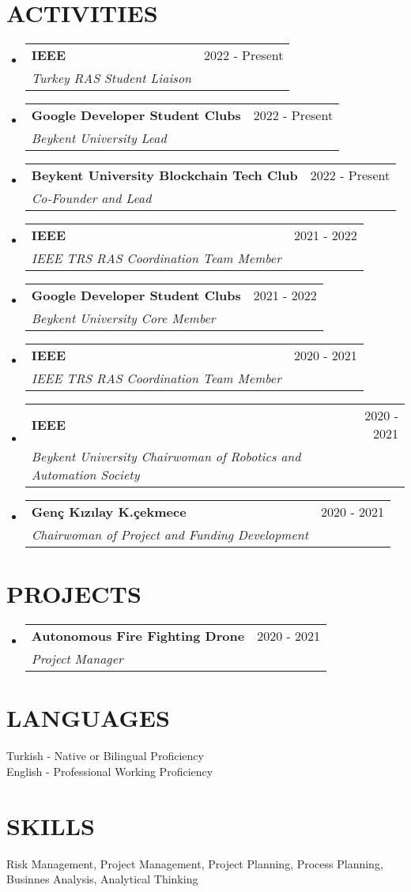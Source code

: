 \documentclass[letterpaper,11pt]{article}
\makeatletter
\newcommand{\resumeSubheading}[4]{
  \vspace{-1pt}\item
    \begin{tabular*}{\textwidth}[t]{l@{\extracolsep{\fill}}r}
      \textbf{#1} & {\color{dark-grey}\small #2}\vspace{1pt}\\ %
      \textit{#3} & {\color{dark-grey} \small #4}\\ %
    \end{tabular*}\vspace{-4pt}
}
\newcommand{\resumeSubHeadingListStart}{\begin{itemize}[leftmargin=0in, label={}]}
\newcommand{\resumeSubHeadingListEnd}{\end{itemize}}
\makeatother
\begin{document}
\section{ACTIVITIES}
  \resumeSubHeadingListStart
    \resumeSubheading
      {IEEE}{2022 - Present}
      {Turkey RAS Student Liaison}{}
    \resumeSubheading
      {Google Developer Student Clubs}{2022 - Present}
      {Beykent University Lead}{}
    \resumeSubheading
      {Beykent University Blockchain Tech Club}{2022 - Present}
      {Co-Founder and Lead}{}
    \resumeSubheading
      {IEEE}{2021 - 2022}
      {IEEE TRS RAS Coordination Team Member} {}
    \resumeSubheading
      {Google Developer Student Clubs}{2021 - 2022}
      {Beykent University Core Member}{}
    \resumeSubheading
      {IEEE}{2020 - 2021}
      {IEEE TRS RAS Coordination Team Member}{}      
    \resumeSubheading
      {IEEE}{2020 - 2021}
      {Beykent University Chairwoman of Robotics and Automation Society}{}
    \resumeSubheading
      {Gen\c{c} K{\i}z{\i}lay K.\c{c}ekmece}{2020 - 2021}
      {Chairwoman of Project and Funding Development}{}
  \resumeSubHeadingListEnd


\section{PROJECTS}
    \resumeSubHeadingListStart
    \resumeSubheading
      {Autonomous Fire Fighting Drone}{2020 - 2021}
      {Project Manager} {}
    \resumeSubHeadingListEnd

\section{LANGUAGES}
 \begin{itemize}[leftmargin=0in, label={}]
    \small{\item{
     {Turkish - Native or Bilingual Proficiency}\vspace{2pt} \\
     {English - Professional Working Proficiency}\vspace{2pt} \\
    }}
 \end{itemize}

\section{SKILLS}
 \begin{itemize}[leftmargin=0in, label={}]
    \small{\item{
     {Risk Management, Project Management, Project Planning, Process Planning, Businnes Analysis, Analytical Thinking}\vspace{2pt} \\
    }}
 \end{itemize}
\end{document}

